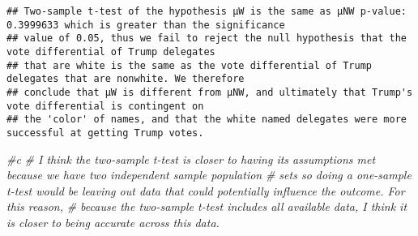 \documentclass[]{article}
\newenvironment{Shaded}{\begin{snugshade}}{\end{snugshade}}
\newcommand{\CommentTok}[1]{\textcolor[rgb]{0.56,0.35,0.01}{\textit{#1}}}
\begin{document}
\begin{verbatim}
## Two-sample t-test of the hypothesis μW is the same as μNW p-value: 0.3999633 which is greater than the significance 
## value of 0.05, thus we fail to reject the null hypothesis that the vote differential of Trump delegates 
## that are white is the same as the vote differential of Trump delegates that are nonwhite. We therefore 
## conclude that μW is different from μNW, and ultimately that Trump's vote differential is contingent on 
## the 'color' of names, and that the white named delegates were more successful at getting Trump votes.
\end{verbatim}

\begin{Shaded}
\begin{Highlighting}[]
\CommentTok{#c}
\CommentTok{# I think the two-sample t-test is closer to having its assumptions met because we have two independent sample population}
\CommentTok{# sets so doing a one-sample t-test would be leaving out data that could potentially influence the outcome. For this reason,}
\CommentTok{# because the two-sample t-test includes all available data, I think it is closer to being accurate across this data. }
\end{Highlighting}
\end{Shaded}
\end{document}

